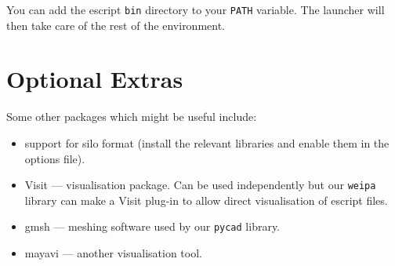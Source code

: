 \begin{optionalstep}
You can add the escript \texttt{bin} directory to your \texttt{PATH} variable.
The launcher will then take care of the rest of the environment.
\end{optionalstep}

\section{Optional Extras}

Some other packages which might be useful include:
\begin{itemize}
 \item support for silo format (install the relevant libraries and enable them in the options file).
 \item Visit --- visualisation package. Can be used independently but our \texttt{weipa} library can make a Visit 
plug-in to allow direct visualisation of escript files.
 \item gmsh --- meshing software used by our \texttt{pycad} library.
 \item mayavi --- another visualisation tool.
\end{itemize}







